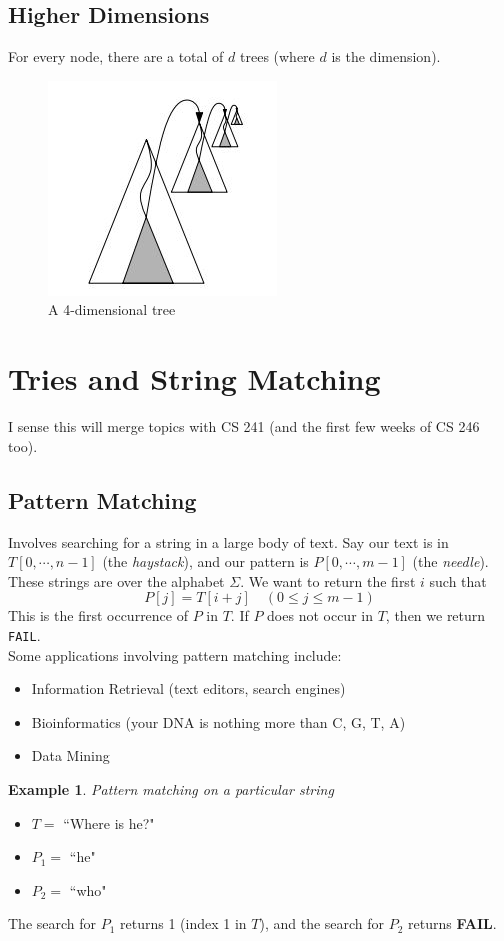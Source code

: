 \documentclass{report}
\newtheorem{ex}{Example}[section]
\begin{document}
\subsection{Higher Dimensions}
For every node, there are a total of $d$ trees (where $d$ is the dimension).
\begin{figure}[ht]
\begin{center}
\includegraphics[scale=0.7]{dimen.jpg}
\end{center}
\caption{A 4-dimensional tree}
\end{figure}
\section{Tries and String Matching}
I sense this will merge topics with CS 241 (and the first few weeks of CS 246 too).
\subsection{Pattern Matching}
Involves searching for a string in a large body of text. Say our text is in $T[0, \cdots, n-1]$ (the \textit{haystack}), and our pattern is $P[0, \cdots, m-1]$ (the \textit{needle}). These strings are over the alphabet $\Sigma$. We want to return the first $i$ such that
$$P[j] = T[i+j] \quad (0 \leq j \leq m-1)$$
This is the first occurrence of $P$ in $T$. If $P$ does not occur in $T$, then we return \texttt{FAIL}.\\Some applications involving pattern matching include:
\begin{itemize}
\item Information Retrieval (text editors, search engines)
\item Bioinformatics (your DNA is nothing more than C, G, T, A)
\item Data Mining
\end{itemize}
\begin{ex}
Pattern matching on a particular string
\end{ex}
\begin{itemize}
\item $T = $ ``Where is he?"
\item $P_1 = $ ``he"
\item $P_2 = $ ``who"
\end{itemize}
The search for $P_1$ returns 1 (index 1 in $T$), and the search for $P_2$ returns \textbf{FAIL}.
\end{document}

